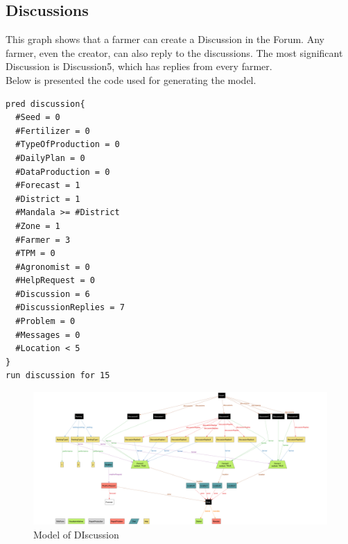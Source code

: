 \subsection{Discussions}
This graph shows that a farmer can create a Discussion in the Forum. Any farmer, even the creator, can also reply to the discussions. The most significant Discussion is Discussion5, which has replies from every farmer.\\
Below is presented the code used for generating the model.
\begin{lstlisting}
pred discussion{
  #Seed = 0
  #Fertilizer = 0
  #TypeOfProduction = 0
  #DailyPlan = 0
  #DataProduction = 0
  #Forecast = 1
  #District = 1
  #Mandala >= #District
  #Zone = 1
  #Farmer = 3
  #TPM = 0
  #Agronomist = 0
  #HelpRequest = 0
  #Discussion = 6
  #DiscussionReplies = 7
  #Problem = 0
  #Messages = 0
  #Location < 5
}
run discussion for 15
\end{lstlisting}
\begin{figure}[H]
\centering
	\includegraphics[angle=90,height=1.5\textwidth]{Images/Model/model3.png}
	\caption{Model of DIscussion}
\end{figure}

